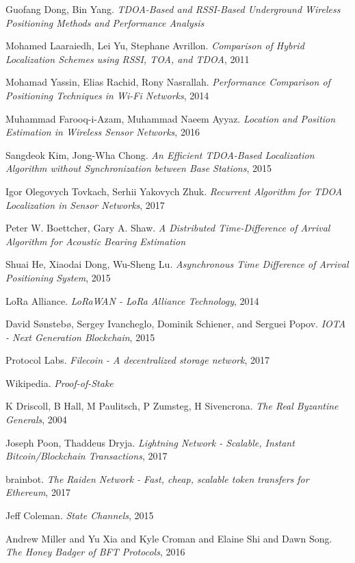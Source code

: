 \documentclass[10pt, nonatbib, nocopyrightspace, reprint]{sigplanconf}
\begin{document}
\begin{thebibliography}{10}
    Guofang Dong, Bin Yang.
    \emph{TDOA-Based and RSSI-Based Underground Wireless Positioning Methods and Performance Analysis}

    Mohamed Laaraiedh, Lei Yu, Stephane Avrillon.
    \emph{Comparison of Hybrid Localization Schemes using RSSI, TOA, and TDOA}, 2011

    Mohamad Yassin, Elias Rachid, Rony Nasrallah.
    \emph{Performance Comparison of Positioning Techniques in Wi-Fi Networks}, 2014

    Muhammad Farooq-i-Azam, Muhammad Naeem Ayyaz.
    \emph{Location and Position Estimation in Wireless Sensor Networks}, 2016

    Sangdeok Kim, Jong-Wha Chong.
    \emph{An Efficient TDOA-Based Localization Algorithm without Synchronization between Base Stations}, 2015

    Igor Olegovych Tovkach, Serhii Yakovych Zhuk.
    \emph{Recurrent Algorithm for TDOA Localization in Sensor Networks}, 2017

    Peter W. Boettcher, Gary A. Shaw.
    \emph{A Distributed Time-Difference of Arrival Algorithm for Acoustic Bearing Estimation}

    Shuai He, Xiaodai Dong, Wu-Sheng Lu.
    \emph{Asynchronous Time Difference of Arrival Positioning System}, 2015

    LoRa Alliance.
    \emph{LoRaWAN - LoRa Alliance Technology}, 2014

    David Sønstebø, Sergey Ivancheglo, Dominik Schiener, and Serguei Popov.
    \emph{IOTA - Next Generation Blockchain}, 2015

    Protocol Labs.
    \emph{Filecoin - A decentralized storage network}, 2017

    Wikipedia.
    \emph{Proof-of-Stake}

     K Driscoll, B Hall, M Paulitsch, P Zumsteg, H Sivencrona.
     \emph{The Real Byzantine Generals}, 2004

    Joseph Poon, Thaddeus Dryja.
    \emph{Lightning Network - Scalable, Instant Bitcoin/Blockchain Transactions}, 2017

    brainbot.
    \emph{The Raiden Network - Fast, cheap, scalable token transfers for Ethereum}, 2017

    Jeff Coleman.
    \emph{State Channels}, 2015

    Andrew Miller and Yu Xia and Kyle Croman and Elaine Shi and Dawn Song.
    \emph{The Honey Badger of BFT Protocols}, 2016

\end{thebibliography}
\end{document}

